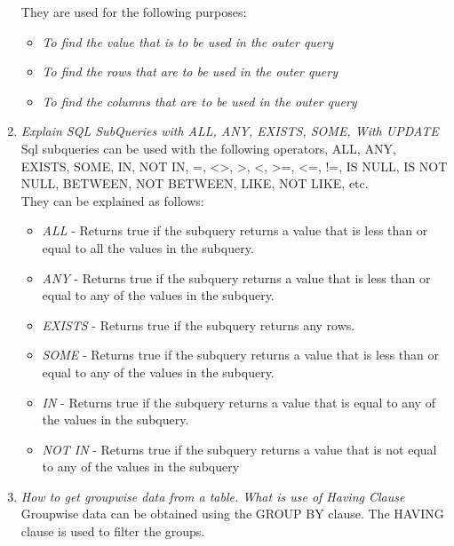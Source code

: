 \documentclass[11pt]{article}
\begin{document}
\begin{enumerate}
They are used for the following purposes:
\begin{itemize}
    \item \textit{To find the value that is to be used in the outer query}
    \item \textit{To find the rows that are to be used in the outer query}
    \item \textit{To find the columns that are to be used in the outer query}
\end{itemize}

\item \textit{Explain SQL SubQueries with ALL, ANY, EXISTS, SOME, With UPDATE}\\

Sql subqueries can be used with the following operators, ALL, ANY, EXISTS, SOME, IN, NOT IN, =, <>, >, <, >=, <=, !=, IS NULL, IS NOT NULL, BETWEEN, NOT BETWEEN, LIKE, NOT LIKE, etc.\\

They can be explained as follows:

\begin{itemize}
    \item \textit{ALL} - Returns true if the subquery returns a value that is less than or equal to all the values in the subquery.
    \item  \textit{ANY} - Returns true if the subquery returns a value that is less than or equal to any of the values in the subquery.
    \item \textit{EXISTS} - Returns true if the subquery returns any rows.
    \item  \textit{SOME} - Returns true if the subquery returns a value that is less than or equal to any of the values in the subquery.
    \item  \textit{IN} - Returns true if the subquery returns a value that is equal to any of the values in the subquery.
    \item \textit{NOT IN} - Returns true if the subquery returns a value that is not equal to any of the values in the subquery
\end{itemize}

\item \textit{How to get groupwise data from a table. What is use of Having Clause}\\

Groupwise data can be obtained using the GROUP BY clause. The HAVING clause is used to filter the groups.\\


\end{enumerate}
\end{document}
